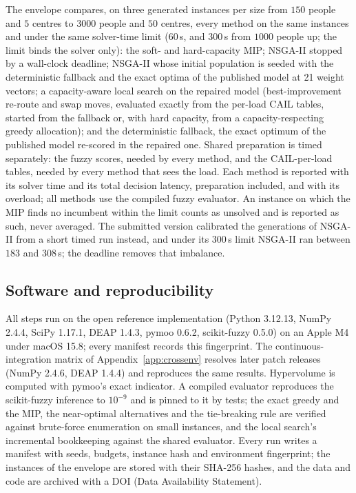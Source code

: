 \documentclass[systems,article,submit,moreauthors,pdftex]{Definitions/mdpi}
\begin{document}
The envelope compares, on three generated instances per size from $150$ people and $5$ centres
to $3000$ people and $50$ centres, every method on the same instances and under the same
solver-time limit ($60$\,s, and $300$\,s from $1000$ people up; the limit binds the solver only): the soft- and hard-capacity MIP;
NSGA-II stopped by a wall-clock deadline; NSGA-II whose initial population is seeded with the
deterministic fallback and the exact optima of the published model at 21 weight vectors; a
capacity-aware local search on the repaired model (best-improvement re-route and swap moves,
evaluated exactly from the per-load CAIL tables, started from the fallback or, with hard
capacity, from a capacity-respecting greedy allocation); and the deterministic fallback, the
exact optimum of the published model re-scored in the repaired one. Shared preparation is timed
separately: the fuzzy scores, needed by every method, and the CAIL-per-load tables, needed by
every method that sees the load. Each method is reported with its solver time and its total
decision latency, preparation included, and with its overload; all methods use the compiled
fuzzy evaluator. An instance on which the MIP finds no incumbent within the limit counts as
unsolved and is reported as such, never averaged. The submitted version calibrated the
generations of NSGA-II from a short timed run instead, and under its $300$\,s limit NSGA-II ran
between $183$ and $308$\,s; the deadline removes that imbalance.

\subsection{Software and reproducibility}
All steps run on the open reference implementation (Python 3.12.13, NumPy 2.4.4, SciPy
1.17.1, DEAP 1.4.3, pymoo 0.6.2, scikit-fuzzy 0.5.0) on an Apple M4 under macOS 15.8; every
manifest records this fingerprint. The continuous-integration matrix of
Appendix~\ref{app:crossenv} resolves later patch releases (NumPy 2.4.6, DEAP 1.4.4) and
reproduces the same results. Hypervolume is computed with pymoo's exact indicator. A
compiled evaluator reproduces the
scikit-fuzzy inference to $10^{-9}$ and is pinned to it by tests; the exact greedy and the
MIP, the near-optimal alternatives and the tie-breaking rule are verified against brute-force
enumeration on small instances, and the local search's incremental bookkeeping against the
shared evaluator. Every run writes a manifest with seeds,
budgets, instance hash and environment fingerprint; the instances of the envelope are stored
with their SHA-256 hashes, and the data and code are archived with a DOI (Data Availability
Statement).
\end{document}
